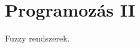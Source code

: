 \documentclass[../../main.tex]{subfiles}
\begin{document}
\section{Programozás II}

\begin{fulltheorem}
	Fuzzy rendszerek.
\end{fulltheorem}
\end{document}
